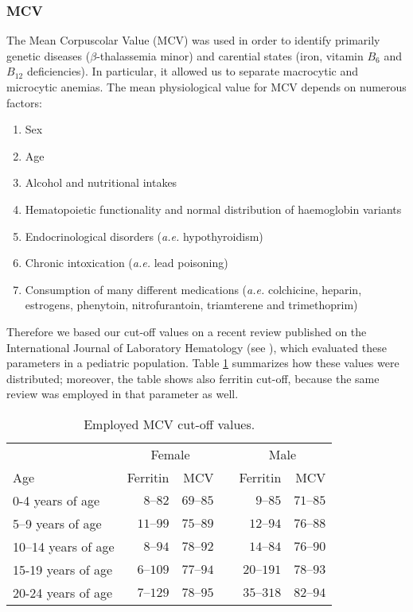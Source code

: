 \subsubsection{MCV}\label{sub:mcv}
The Mean Corpuscolar Value (MCV) was used in order to identify primarily genetic diseases ($\beta$-thalassemia minor) and carential states (iron, vitamin $B_{6}$ and $B_{12}$ deficiencies). In particular, it allowed us to separate macrocytic and microcytic anemias. The mean physiological value for MCV depends on numerous factors:

\begin{enumerate}
	\item Sex
	\item Age
	\item Alcohol and nutritional intakes
	\item Hematopoietic functionality and normal distribution of haemoglobin variants
	\item Endocrinological disorders (\textit{a.e.} hypothyroidism)
	\item Chronic intoxication (\textit{a.e.} lead poisoning)
	\item Consumption of many different medications (\textit{a.e.} colchicine, heparin, estrogens, phenytoin, nitrofurantoin, triamterene and trimethoprim)
\end{enumerate}

Therefore we based our cut-off values on a recent review published on the International Journal of Laboratory Hematology (see \cite{MCVferritincutoff}), which evaluated these parameters in a pediatric population. Table \ref{tab:cutoffmcv} summarizes how these values were distributed; moreover, the table shows also ferritin cut-off, because the same review was employed in that parameter as well.

\begin{table}[H]
   \centering
   \begin{tabular}{l r r c r r}
   	  & \multicolumn{2}{c}{Female} & & \multicolumn{2}{c}{Male}\\
   	 \cline{2-3} \cline{5-6}
      Age & Ferritin\footnotemark[1] & MCV\footnotemark[2] & & Ferritin\footnotemark[1] & MCV\footnotemark[2]\\
      \hline
      0-4 years of age & $8–82$ & $69–85$ & & $9–85$ & $71–85$\\
      5–9 years of age & $11–99$ & $75–89$ & & $12–94$ & $76–88$\\
      10–14 years of age & $8–94$ & $78–92$ & & $14–84$ & $76–90$\\
      15-19 years of age & $6–109$ & $77–94$ & & $20–191$ & $78–93$\\
      20-24 years of age & $7–129$ & $78–95$ & & $35–318$ & $82–94$\\
   \end{tabular}
   \caption{Employed MCV cut-off values.}
    \label{tab:cutoffmcv}
\end{table}


